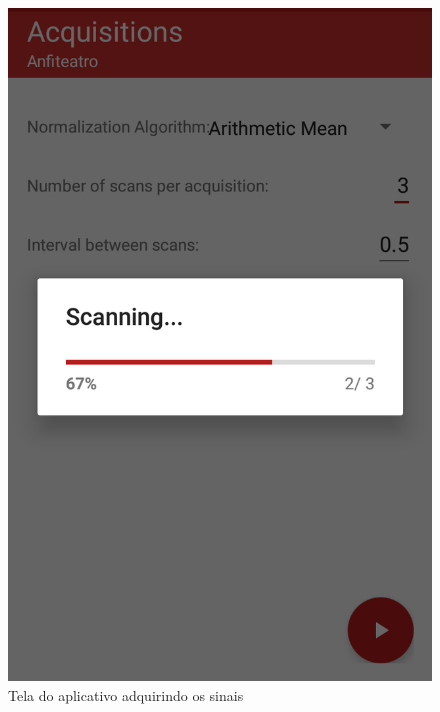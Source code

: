 \begin{figure}[H]
\begin{minipage}[b]{0.4\textwidth}
    \includegraphics[width=\textwidth]{imagens/screenshots/measuring.png}
    \caption{Tela do aplicativo adquirindo os sinais}
  \end{minipage}
\end{figure}

